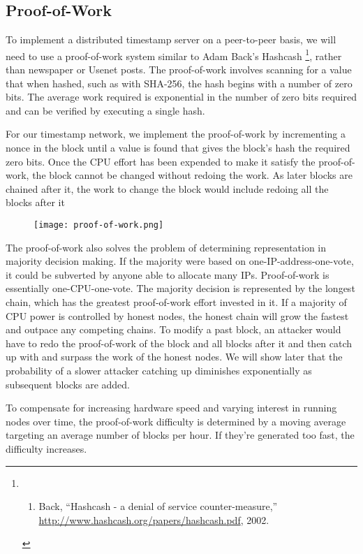 \subsection{Proof-of-Work}\label{proof-of-work}

To implement a distributed timestamp server on a peer-to-peer basis, we
will need to use a proof-of-work system similar to Adam Back's Hashcash
\footnote{\begin{enumerate}
  \def\labelenumi{\Alph{enumi}.}
  \tightlist
  \item
    Back, ``Hashcash - a denial of service counter-measure,''
    \url{http://www.hashcash.org/papers/hashcash.pdf}, 2002.
  \end{enumerate}}, rather than newspaper or Usenet posts. The
proof-of-work involves scanning for a value that when hashed, such as
with SHA-256, the hash begins with a number of zero bits. The average
work required is exponential in the number of zero bits required and can
be verified by executing a single hash.

For our timestamp network, we implement the proof-of-work by
incrementing a nonce in the block until a value is found that gives the
block's hash the required zero bits. Once the CPU effort has been
expended to make it satisfy the proof-of-work, the block cannot be
changed without redoing the work. As later blocks are chained after it,
the work to change the block would include redoing all the blocks after
it

\begin{figure}
\centering
\texttt{[image: proof-of-work.png]}
\caption{}
\end{figure}

The proof-of-work also solves the problem of determining representation
in majority decision making. If the majority were based on
one-IP-address-one-vote, it could be subverted by anyone able to
allocate many IPs. Proof-of-work is essentially one-CPU-one-vote. The
majority decision is represented by the longest chain, which has the
greatest proof-of-work effort invested in it. If a majority of CPU power
is controlled by honest nodes, the honest chain will grow the fastest
and outpace any competing chains. To modify a past block, an attacker
would have to redo the proof-of-work of the block and all blocks after
it and then catch up with and surpass the work of the honest nodes. We
will show later that the probability of a slower attacker catching up
diminishes exponentially as subsequent blocks are added.

To compensate for increasing hardware speed and varying interest in
running nodes over time, the proof-of-work difficulty is determined by a
moving average targeting an average number of blocks per hour. If
they're generated too fast, the difficulty increases.

